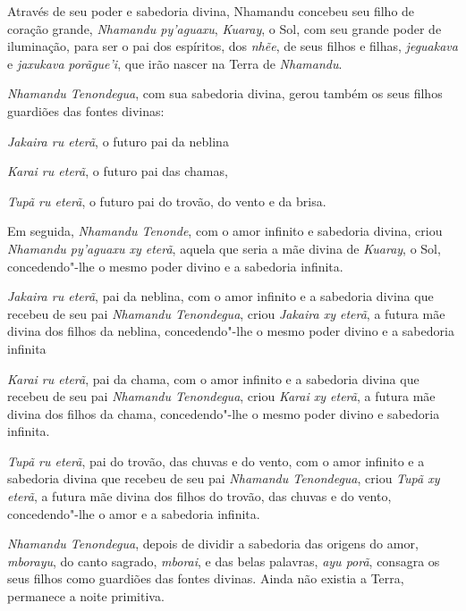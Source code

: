 
 

 

Através de seu poder e sabedoria divina, Nhamandu concebeu seu filho de
coração grande, \emph{Nhamandu py'aguaxu}, \emph{Kuaray}, o Sol, com seu
grande poder de iluminação, para ser o pai dos espíritos, dos
\emph{nhẽe}, de seus filhos e filhas, \emph{jeguakava} e \emph{jaxukava}
\emph{porãgue'i}, que irão nascer na Terra de \emph{Nhamandu}.

\emph{Nhamandu Tenondegua}, com sua sabedoria divina, gerou também os
seus filhos guardiões das fontes divinas:

\emph{Jakaira ru eterã}, o futuro pai da neblina

\emph{Karai ru eterã}, o futuro pai das chamas,

\emph{Tupã ru eterã}, o futuro pai do trovão, do vento e da brisa.

Em seguida, \emph{Nhamandu Tenonde}, com o amor infinito e sabedoria
divina, criou \emph{Nhamandu py'aguaxu xy eterã}, aquela que seria a mãe
divina de \emph{Kuaray}, o Sol, concedendo"-lhe o mesmo poder divino e a
sabedoria infinita.

\emph{Jakaira ru eterã}, pai da neblina, com o amor infinito e a
sabedoria divina que recebeu de seu pai \emph{Nhamandu Tenondegua},
criou \emph{Jakaira xy eterã}, a futura mãe divina dos filhos da
neblina, concedendo"-lhe o mesmo poder divino e a sabedoria infinita

\emph{Karai ru eterã}, pai da chama, com o amor infinito e a sabedoria
divina que recebeu de seu pai \emph{Nhamandu Tenondegua}, criou
\emph{Karai xy eterã}, a futura mãe divina dos filhos da chama,
concedendo"-lhe o mesmo poder divino e sabedoria infinita.

\emph{Tupã ru eterã}, pai do trovão, das chuvas e do vento, com o amor
infinito e a sabedoria divina que recebeu de seu pai \emph{Nhamandu
Tenondegua}, criou \emph{Tupã xy eterã}, a futura mãe divina dos filhos
do trovão, das chuvas e do vento, concedendo"-lhe o amor e a sabedoria
infinita.

\emph{Nhamandu Tenondegua}, depois de dividir a sabedoria das origens do
amor, \emph{mborayu}, do canto sagrado, \emph{mborai}, e das belas
palavras, \emph{ayu porã}, consagra os seus filhos como guardiões das
fontes divinas. Ainda não existia a Terra, permanece a noite primitiva.


